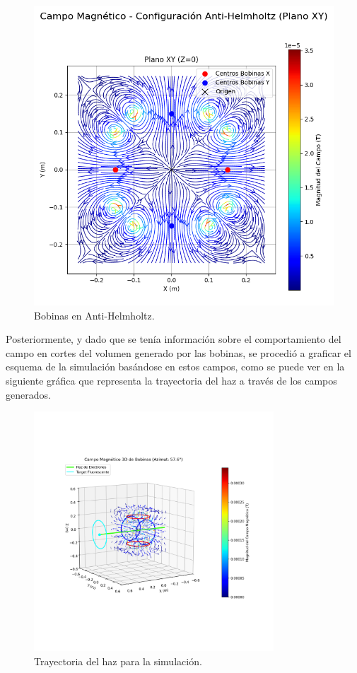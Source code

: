 \begin{figure}[H]
\begin{minipage}[b]{0.48\textwidth}
        \includegraphics[width=\linewidth]{Sections/Figures/antihelmholtz_xy_field.png}
        \caption{Bobinas en  Anti-Helmholtz.}
        \label{fig:antihelmholtz_xy_field}
    \end{minipage}
    \label{fig:campos_bobinas}
\end{figure}

Posteriormente, y dado que se tenía información sobre el comportamiento del
campo en cortes del volumen generado por las bobinas, se procedió a graficar el
esquema de la simulación basándose en estos campos, como se puede ver en la
siguiente gráfica que representa la trayectoria del haz a través de los campos
generados.

\begin{figure}[H]
    \centering
    \includegraphics[width=0.8\textwidth]{Sections/Figures/frame_azim_057.6.png}
    \caption{Trayectoria del haz para la simulación.}
    \label{fig:trayectoria_haz_simulacion}
\end{figure}

